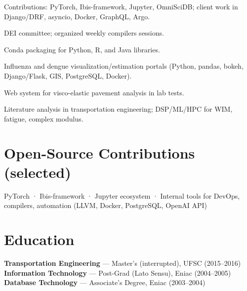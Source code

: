 \documentclass[10pt,a4paper]{article}
\begin{document}
\begin{tightitemize}
  \item Contributions: PyTorch, Ibis-framework, Jupyter, OmniSciDB; client work in Django/DRF, asyncio, Docker, GraphQL, Argo.
  \item DEI committee; organized weekly compilers sessions.
\end{tightitemize}

\begin{tightitemize}
  \item Conda packaging for Python, R, and Java libraries.
\end{tightitemize}

\begin{tightitemize}
  \item Influenza and dengue visualization/estimation portals (Python, pandas, bokeh, Django/Flask, GIS, PostgreSQL, Docker).
\end{tightitemize}

\begin{tightitemize}
  \item Web system for visco-elastic pavement analysis in lab tests.
\end{tightitemize}

\begin{tightitemize}
  \item Literature analysis in transportation engineering; DSP/ML/HPC for WIM, fatigue, complex modulus.
\end{tightitemize}

\section{Open-Source Contributions (selected)}
PyTorch · Ibis-framework · Jupyter ecosystem · Internal tools for DevOps, compilers, automation (LLVM, Docker, PostgreSQL, OpenAI API)

\section{Education}
\textbf{Transportation Engineering} — Master’s (interrupted), UFSC (2015–2016) \\
\textbf{Information Technology} — Post-Grad (Lato Sensu), Eniac (2004–2005) \\
\textbf{Database Technology} — Associate’s Degree, Eniac (2003–2004)
\end{document}

